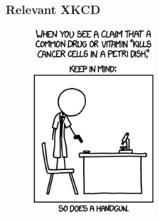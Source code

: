 \documentclass{beamer}
\begin{document}
\begin{frame}
  \frametitle{Relevant XKCD}

  \begin{figure}[!htb]
    \includegraphics[width=0.4\textwidth]{figs/xkcd-cells.png}
  \end{figure}
\end{frame}
\end{document}
